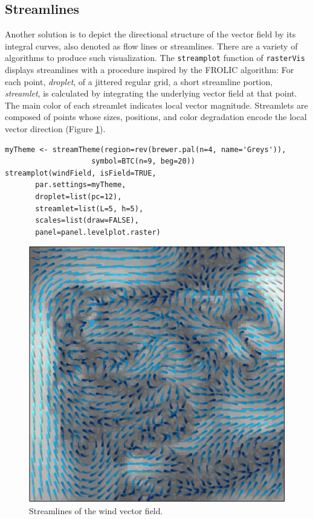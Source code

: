 \documentclass[smallroyalvopaper]{memoir}
\begin{document}
\subsection{Streamlines}
\label{sec-1-2}
Another solution is to depict the directional structure of the vector
field by its integral curves, also denoted as flow lines or
streamlines. There are a variety of algorithms to produce such
visualization. The \texttt{streamplot} function of \texttt{rasterVis} displays
streamlines with a procedure inspired by the FROLIC algorithm: For
each point, \emph{droplet}, of a jittered regular grid, a short streamline
portion, \emph{streamlet}, is calculated by integrating the underlying
vector field at that point. The main color of each streamlet indicates
local vector magnitude. Streamlets are composed of points whose sizes,
positions, and color degradation encode the local vector direction
(Figure \ref{fig:streamplot}).

\lstset{language=R,numbers=none}
\begin{lstlisting}
myTheme <- streamTheme(region=rev(brewer.pal(n=4, name='Greys')),
				    symbol=BTC(n=9, beg=20))
streamplot(windField, isField=TRUE,
	   par.settings=myTheme,
	   droplet=list(pc=12),
	   streamlet=list(L=5, h=5),
	   scales=list(draw=FALSE),
	   panel=panel.levelplot.raster)
\end{lstlisting}

\begin{figure}[htb]
\centering
\includegraphics[width=.9\linewidth]{figs/streamplot.pdf}
\caption{\label{fig:streamplot}Streamlines of the wind vector field.}
\end{figure}
\end{document}
